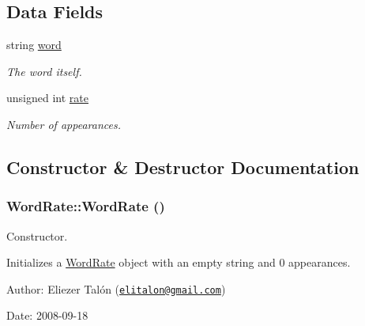 \subsection*{Data Fields}
\begin{CompactItemize}
\item 
\hypertarget{struct_word_rate_38d2adc9d4f6463bd66916be8f52d5f4}{
string \hyperlink{struct_word_rate_38d2adc9d4f6463bd66916be8f52d5f4}{word}}
\label{struct_word_rate_38d2adc9d4f6463bd66916be8f52d5f4}

\begin{CompactList}\small\item\em The word itself. \item\end{CompactList}\item 
\hypertarget{struct_word_rate_7e72f43d0fd5042d844f2cb234d11568}{
unsigned int \hyperlink{struct_word_rate_7e72f43d0fd5042d844f2cb234d11568}{rate}}
\label{struct_word_rate_7e72f43d0fd5042d844f2cb234d11568}

\begin{CompactList}\small\item\em Number of appearances. \item\end{CompactList}\end{CompactItemize}


\subsection{Constructor \& Destructor Documentation}
\hypertarget{struct_word_rate_c22aaa0c04769cce44ba08bf5e6eb655}{
\subsubsection[WordRate]{\setlength{\rightskip}{0pt plus 5cm}WordRate::WordRate ()}}
\label{struct_word_rate_c22aaa0c04769cce44ba08bf5e6eb655}


Constructor. 

Initializes a \hyperlink{struct_word_rate}{WordRate} object with an empty string and 0 appearances.

\begin{Desc}
\item[Author:]Eliezer Talón (\href{mailto:elitalon@gmail.com}{\tt elitalon@gmail.com}) \end{Desc}
\begin{Desc}
\item[Date:]2008-09-18 \end{Desc}


